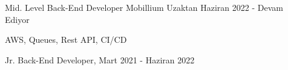 
\begin{cventries}
  \cventry
    {Mid. Level Back-End Developer} %
    {Mobillium} %
    {Uzaktan} %
    {Haziran 2022 - Devam Ediyor} %
    {
      \begin{cvitems} %
        \item AWS, Queues, Rest API, CI/CD
      	\item Jr. Back-End Developer, Mart 2021 - Haziran 2022
      \end{cvitems}
    }
\end{cventries}
